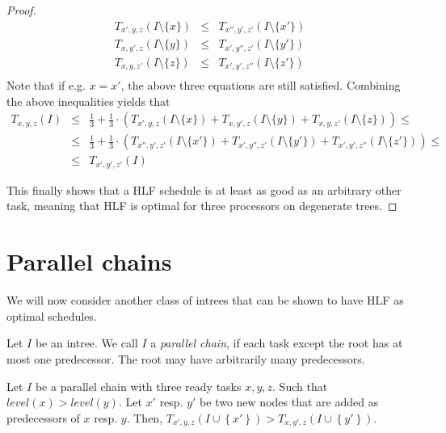 \begin{proof}
  \begin{eqnarray*}
    T_{x',y,z}(I\setminus\{x\})
    & \leq &
    T_{x'',y',z'}(I\setminus\{x'\}) \\
    T_{x,y',z}(I\setminus\{y\})
    & \leq &
    T_{x',y'',z'}(I\setminus\{y'\}) \\
    T_{x,y,z'}(I\setminus\{z\})
    & \leq &
    T_{x',y',z''}(I\setminus\{z'\}) \\
  \end{eqnarray*}
  Note that if e.g. $x=x'$, the above three equations are still satisfied.
  Combining the above inequalities yields that
  \begin{eqnarray*}
    T_{x,y,z}(I) 
    & \leq & 
    \frac{1}{3} + \frac{1}{3} \cdot 
    \left( 
      T_{x',y,z}(I\setminus\{x\}) +
      T_{x,y',z}(I\setminus\{y\}) +
      T_{x,y,z'}(I\setminus\{z\})
    \right) 
    \leq \\
    & \leq &
    \frac{1}{3} + \frac{1}{3} \cdot 
    \left( 
      T_{x'',y',z'}(I\setminus\{x'\}) +
      T_{x',y'',z'}(I\setminus\{y'\}) +
      T_{x',y',z''}(I\setminus\{z'\})
    \right) \leq \\
    & \leq &
    T_{x',y',z'}(I)
  \end{eqnarray*}

  This finally shows that a HLF schedule is at least as good as an arbitrary other task, meaning that HLF is optimal for three processors on degenerate trees.
\end{proof}

\section{Parallel chains}
\label{sec:p3-parallel-chains}

We will now consider another class of intrees that can be shown to have HLF as optimal schedules.

\begin{definition}
  Let $I$ be an intree. We call $I$ a \emph{parallel chain}, if each task except the root has at most one predecessor. The root may have arbitrarily many predecessors.
\end{definition}


\begin{lemma}
  \label{lem:parallel-chains-chain-switching-higher-is-worse}
  Let $I$ be a parallel chain with three ready tasks $x,y,z$. Such that $level(x)>level(y)$. Let $x'$ resp. $y'$ be two new nodes that are added as predecessors of $x$ resp. $y$. Then, $T_{x',y,z}(I\cup\left\{ x' \right\}) > T_{x,y',z}(I\cup\left\{ y' \right\})$. 
\end{lemma}

